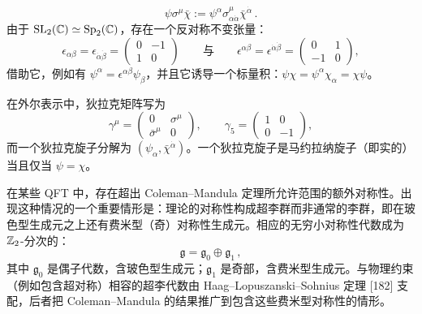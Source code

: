 \[
\psi\sigma^\mu\bar\chi:=\psi^\alpha\sigma^\mu_{\alpha\dot\alpha}\bar\chi^{\dot\alpha}\,.
\]
由于 $\operatorname{SL}_2(\mathbb{C})\simeq\operatorname{Sp}_2(\mathbb{C})$，存在一个反对称不变张量：
\[
\epsilon_{\alpha\beta}=\epsilon_{\dot\alpha\dot\beta}=\begin{pmatrix}0&-1\\ 1&0\end{pmatrix}
\qquad\text{与}\qquad
\epsilon^{\alpha\beta}=\epsilon^{\dot\alpha\dot\beta}=\begin{pmatrix}0&1\\ -1&0\end{pmatrix},
\]
借助它，例如有 $\psi^\alpha=\epsilon^{\alpha\beta}\psi_\beta$，并且它诱导一个标量积：$\psi\chi=\psi^\alpha\chi_\alpha=\chi\psi$。

在外尔表示中，狄拉克矩阵写为
\[
\gamma^\mu=\begin{pmatrix}0&\sigma^\mu\\ \bar\sigma^\mu&0\end{pmatrix},\qquad
\gamma_5=\begin{pmatrix}1&0\\ 0&-1\end{pmatrix},
\]
而一个狄拉克旋子分解为 $(\psi_\alpha,\bar\chi^{\dot\alpha})$。一个狄拉克旋子是马约拉纳旋子（即实的）当且仅当 $\psi=\chi$。

在某些 QFT 中，存在超出 Coleman–Mandula 定理所允许范围的额外对称性。出现这种情况的一个重要情形是：理论的对称性构成超李群而非通常的李群，即在玻色型生成元之上还有费米型（奇）对称性生成元。相应的无穷小对称性代数成为 $\mathbb{Z}_2$-分次的：
\[
\mathfrak{g}=\mathfrak{g}_0\oplus\mathfrak{g}_1\,,
\]
其中 $\mathfrak{g}_0$ 是偶子代数，含玻色型生成元；$\mathfrak{g}_1$ 是奇部，含费米型生成元。与物理约束（例如包含超对称）相容的超李代数由 Haag–Lopuszanski–Sohnius 定理 [182] 支配，后者把 Coleman–Mandula 的结果推广到包含这些费米型对称性的情形。

